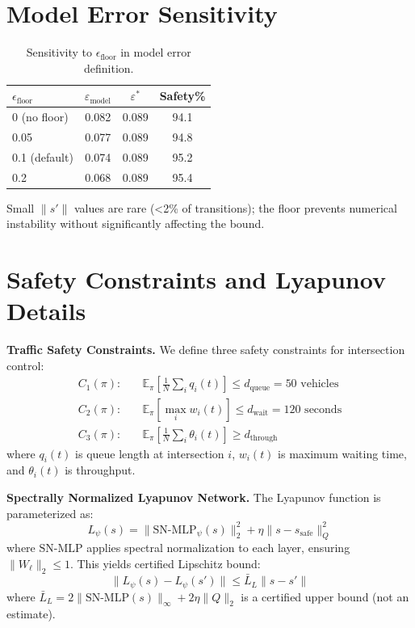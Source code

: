 \documentclass{article}
\theoremstyle{plain}
\theoremstyle{definition}
\theoremstyle{remark}
\begin{document}
\section{Model Error Sensitivity}
\label{app:model_error}

\begin{table}[H]
\centering
\caption{Sensitivity to $\epsilon_{\text{floor}}$ in model error definition.}
\label{tab:eps_floor}
\begin{tabular}{lccc}
\toprule
$\epsilon_{\text{floor}}$ & $\varepsilon_{\text{model}}$ & $\varepsilon^*$ & Safety\% \\
\midrule
0 (no floor) & 0.082 & 0.089 & 94.1 \\
0.05 & 0.077 & 0.089 & 94.8 \\
0.1 (default) & 0.074 & 0.089 & 95.2 \\
0.2 & 0.068 & 0.089 & 95.4 \\
\bottomrule
\end{tabular}
\end{table}

Small $\|s'\|$ values are rare (<2\% of transitions); the floor prevents numerical instability without significantly affecting the bound.

\section{Safety Constraints and Lyapunov Details}
\label{app:safety_details}

\textbf{Traffic Safety Constraints.} We define three safety constraints for intersection control:
\begin{align}
C_1(\pi): & \quad \mathbb{E}_\pi\left[\frac{1}{N}\sum_i q_i(t)\right] \leq d_{\text{queue}} = 50 \text{ vehicles} \\
C_2(\pi): & \quad \mathbb{E}_\pi\left[\max_i w_i(t)\right] \leq d_{\text{wait}} = 120 \text{ seconds} \\
C_3(\pi): & \quad \mathbb{E}_\pi\left[\frac{1}{N}\sum_i \theta_i(t)\right] \geq d_{\text{through}}
\end{align}
where $q_i(t)$ is queue length at intersection $i$, $w_i(t)$ is maximum waiting time, and $\theta_i(t)$ is throughput.

\textbf{Spectrally Normalized Lyapunov Network.} The Lyapunov function is parameterized as:
\begin{equation}
L_\psi(s) = \|\text{SN-MLP}_\psi(s)\|_2^2 + \eta \|s - s_{\text{safe}}\|_Q^2
\end{equation}
where $\text{SN-MLP}$ applies spectral normalization \citep{miyato2018spectral} to each layer, ensuring $\|W_\ell\|_2 \leq 1$. This yields certified Lipschitz bound:
\begin{equation}
\|L_\psi(s) - L_\psi(s')\| \leq \bar{L}_L \|s - s'\|
\end{equation}
where $\bar{L}_L = 2\|\text{SN-MLP}(s)\|_\infty + 2\eta\|Q\|_2$ is a certified upper bound (not an estimate).
\end{document}

